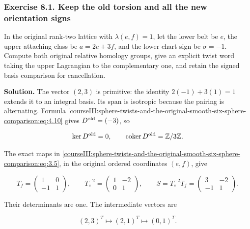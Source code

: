 \subsubsection{Exercise 8.1. Keep the old torsion and all the new orientation signs}
\label{courseIII:sphere-twists-and-the-original-smooth-six-sphere-comparison:exercise-8.1}

In the original rank-two lattice with \(\lambda(e,f)=1\), let the lower belt be \(e\), the upper attaching class be \(a=2e+3f\), and the lower chart sign be \(\sigma=-1\). Compute both original relative homology groups, give an explicit twist word taking the upper Lagrangian to the complementary one, and retain the signed basis comparison for cancellation.

\textbf{Solution.} The vector \((2,3)\) is primitive: the identity \(2(-1)+3(1)=1\) extends it to an integral basis. Its span is isotropic because the pairing is alternating. Formula \eqref{courseIII:sphere-twists-and-the-original-smooth-six-sphere-comparison:eq:4.10} gives \(D^{\rm old}=(-3)\), so

\begin{equation}
\ker D^{\rm old}=0,\qquad
       \operatorname{coker}D^{\rm old}=\mathbb Z/3\mathbb Z .
 \label{courseIII:sphere-twists-and-the-original-smooth-six-sphere-comparison:eq:8.1}
\end{equation}

The exact maps in \eqref{courseIII:sphere-twists-and-the-original-smooth-six-sphere-comparison:eq:3.5}, in the original ordered coordinates \((e,f)\), give

\begin{equation}
T_f=\begin{pmatrix}1&0\\-1&1\end{pmatrix},\qquad
 T_e^{-2}=\begin{pmatrix}1&-2\\0&1\end{pmatrix},\qquad
 S=T_e^{-2}T_f=\begin{pmatrix}3&-2\\-1&1\end{pmatrix}.
 \label{courseIII:sphere-twists-and-the-original-smooth-six-sphere-comparison:eq:8.2}
\end{equation}

Their determinants are one. The intermediate vectors are

\begin{equation}
(2,3)^T\longmapsto(2,1)^T
                                      \longmapsto(0,1)^T .
 \label{courseIII:sphere-twists-and-the-original-smooth-six-sphere-comparison:eq:8.3}
\end{equation}


